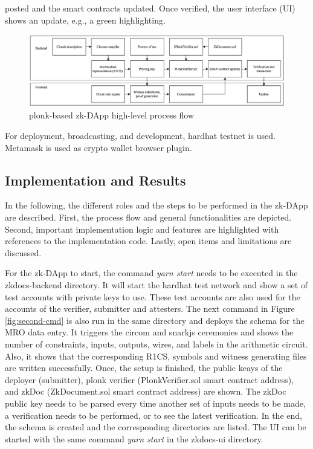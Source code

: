 posted and the smart contracts updated. Once verified, the user interface (UI) shows an update, e.g., a green highlighting. 
\begin{figure}[hbt]
	\centering
		\includegraphics[width=1.0\textwidth]{Pictures/circom snarkjs process flow.png}
	\caption{plonk-based zk-DApp high-level process flow}
	\label{fig:zk-DAppgeneral}
\end{figure}
For deployment, broadcasting, and development, hardhat testnet is used. Metamask is used as crypto wallet browser plugin.

\subsection{Implementation and Results}
In the following, the different roles and the steps to be performed in the zk-DApp are described. First, the process flow and general functionalities are depicted. Second, important implementation logic and features are highlighted with references to the implementation code. Lastly, open items and limitations are discussed.

For the zk-DApp to start, the command \textit{yarn start} needs to be executed in the zkdocs-backend directory. It will start the hardhat test network and show a set of test accounts with private keys to use. These test accounts are also used for the accounts of the verifier, submitter and attesters. The next command in Figure \ref{fig:second-cmd} is also run in the same directory and deploys the schema for the MRO data entry. It triggers the circom and snarkjs ceremonies and shows the number of constraints, inputs, outputs, wires, and labels in the arithmetic circuit. Also, it shows that the corresponding R1CS, symbols and witness generating files are written successfully. Once, the setup is finished, the public keays of the deployer (submitter), plonk verifier (PlonkVerifier.sol smart contract address), and zkDoc (ZkDocument.sol smart contract address) are shown. The zkDoc public key needs to be parsed every time another set of inputs needs to be made, a verification needs to be performed, or to see the latest verification. In the end, the schema is created and the corresponding directories are listed. The UI can be started with the same command \textit{yarn start} in the zkdocs-ui directory.

